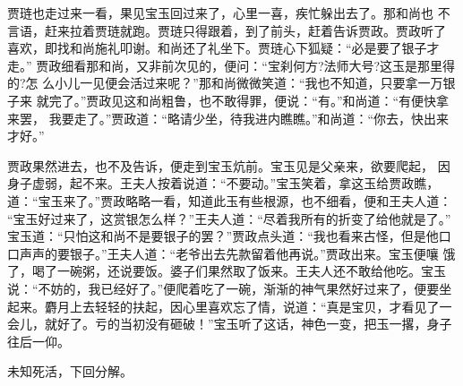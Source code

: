 贾琏也走过来一看，果见宝玉回过来了，心里一喜，疾忙躲出去了。那和尚也
不言语，赶来拉着贾琏就跑。贾琏只得跟着，到了前头，赶着告诉贾政。贾政听了
喜欢，即找和尚施礼叩谢。和尚还了礼坐下。贾琏心下狐疑：“必是要了银子才走。”
贾政细看那和尚，又非前次见的，便问：“宝刹何方?法师大号?这玉是那里得的?怎
么小儿一见便会活过来呢？”那和尚微微笑道：“我也不知道，只要拿一万银子来
就完了。”贾政见这和尚粗鲁，也不敢得罪，便说：“有。”和尚道：“有便快拿来罢，
我要走了。”贾政道：“略请少坐，待我进内瞧瞧。”和尚道：“你去，快出来才好。”

贾政果然进去，也不及告诉，便走到宝玉炕前。宝玉见是父亲来，欲要爬起，
因身子虚弱，起不来。王夫人按着说道：“不要动。”宝玉笑着，拿这玉给贾政瞧，
道：“宝玉来了。”贾政略略一看，知道此玉有些根源，也不细看，便和王夫人道：
“宝玉好过来了，这赏银怎么样？”王夫人道：“尽着我所有的折变了给他就是了。”
宝玉道：“只怕这和尚不是要银子的罢？”贾政点头道：“我也看来古怪，但是他口
口声声的要银子。”王夫人道：“老爷出去先款留着他再说。”贾政出来。宝玉便嚷
饿了，喝了一碗粥，还说要饭。婆子们果然取了饭来。王夫人还不敢给他吃。宝玉
说：“不妨的，我已经好了。”便爬着吃了一碗，渐渐的神气果然好过来了，便要坐
起来。麝月上去轻轻的扶起，因心里喜欢忘了情，说道：“真是宝贝，才看见了一
会儿，就好了。亏的当初没有砸破！”宝玉听了这话，神色一变，把玉一撂，身子
往后一仰。

未知死活，下回分解。